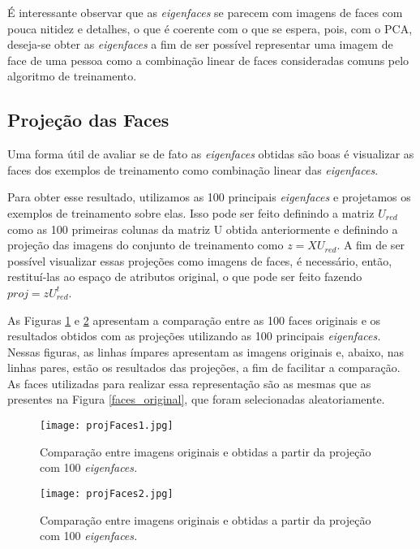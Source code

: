\documentclass[12pt]{article}
\begin{document}
É interessante observar que as \textit{eigenfaces} se parecem com imagens de faces com pouca nitidez e detalhes, o que é coerente com o que se espera, pois, com o PCA, deseja-se obter as \textit{eigenfaces} a fim de ser possível representar uma imagem de face de uma pessoa como a combinação linear de faces consideradas comuns pelo algoritmo de treinamento. 

\subsection{Projeção das Faces} \label{proj}
Uma forma útil de avaliar se de fato as \textit{eigenfaces} obtidas são boas é visualizar as faces dos exemplos de treinamento como combinação linear das \textit{eigenfaces}.

Para obter esse resultado, utilizamos as 100 principais \textit{eigenfaces} e projetamos os exemplos de treinamento sobre elas. Isso pode ser feito definindo a matriz $U_{red}$ como as 100 primeiras colunas da matriz U obtida anteriormente e definindo a projeção das imagens do conjunto de treinamento como $z=X U_{red}$. A fim de ser possível visualizar essas projeções como imagens de faces, é necessário, então, restituí-las ao espaço de atributos original, o que pode ser feito fazendo $proj = z U_{red}^t$.

As Figuras \ref{projFaces1} e \ref{projFaces2} apresentam a comparação entre as 100 faces originais e os resultados obtidos com as projeções utilizando as 100 principais \textit{eigenfaces.} Nessas figuras, as linhas ímpares apresentam as imagens originais e, abaixo, nas linhas pares, estão os resultados das projeções, a fim de facilitar a comparação. As faces utilizadas para realizar essa representação são as mesmas que as presentes na Figura \ref{faces_original}, que foram selecionadas aleatoriamente. 

\begin{figure} [htp]
\begin{center}
\texttt{[image: projFaces1.jpg]}
\caption{Comparação entre imagens originais e obtidas a partir da projeção com 100 \textit{eigenfaces.}} \label{projFaces1}
\end{center}
\end{figure} 

\begin{figure} [htp]
\begin{center}
\texttt{[image: projFaces2.jpg]}
\caption{Comparação entre imagens originais e obtidas a partir da projeção com 100 \textit{eigenfaces.}} \label{projFaces2}
\end{center}
\end{figure} 
\end{document}
